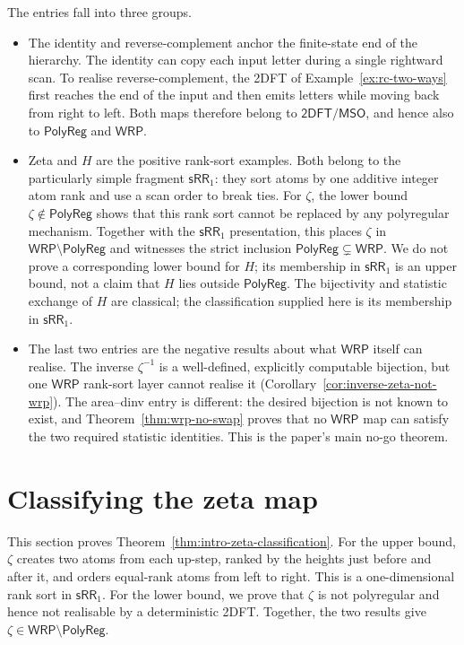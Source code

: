 \documentclass[11pt]{article}
\theoremstyle{definition}
\newcommand{\WRP}{\mathsf{WRP}}
\newcommand{\SWR}{\mathsf{sRR}_1}
\newcommand{\TDFT}{\mathsf{2DFT}}
\newcommand{\MSO}{\mathsf{MSO}}
\newcommand{\polyreg}{\mathsf{PolyReg}}
\begin{document}
The entries fall into three groups.
\begin{itemize}
\item The identity and reverse-complement anchor the finite-state end of the
hierarchy.  The identity can copy each input letter during a single rightward
scan.  To realise reverse-complement, the 2DFT of
Example~\ref{ex:rc-two-ways} first reaches the end of the input and then emits
letters while moving back from right to left.  Both maps therefore belong to
$\TDFT/\MSO$, and hence also to $\polyreg$ and $\WRP$.
\item Zeta and $H$ are the positive rank-sort examples.  Both
belong to the particularly simple fragment $\SWR$: they sort atoms by one
additive integer atom rank and use a scan order to break ties.  For $\zeta$, the
lower bound $\zeta\notin\polyreg$ shows that this rank sort cannot be replaced
by any polyregular mechanism.  Together with the $\SWR$ presentation, this
places $\zeta$ in $\WRP\setminus\polyreg$ and witnesses the strict inclusion
$\polyreg\subsetneq\WRP$.  We do not prove a corresponding lower bound for
$H$; its membership in $\SWR$ is an upper bound, not a claim that $H$ lies
outside $\polyreg$.  The bijectivity and statistic exchange of $H$ are
classical; the classification supplied here is its membership in $\SWR$.
\item The last two entries are the negative results about what $\WRP$ itself
can realise.  The inverse
$\zeta^{-1}$ is a well-defined, explicitly computable bijection, but one $\WRP$
rank-sort layer cannot realise it
(Corollary~\ref{cor:inverse-zeta-not-wrp}).  The area--dinv entry is different:
the desired bijection is not known to exist, and
Theorem~\ref{thm:wrp-no-swap} proves that no $\WRP$ map can satisfy the two
required statistic identities.  This is the paper's main no-go theorem.
\end{itemize}

\section{Classifying the zeta map}\label{sec:zeta}

This section proves Theorem~\ref{thm:intro-zeta-classification}.  For the upper
bound, $\zeta$ creates two atoms from each up-step, ranked by the heights just
before and after it, and orders equal-rank atoms from left to right.  This is a
one-dimensional rank sort in $\SWR$.  For the lower bound, we prove that
$\zeta$ is not polyregular and hence not realisable by a deterministic 2DFT.
Together, the two results give $\zeta\in\WRP\setminus\polyreg$.
\end{document}
